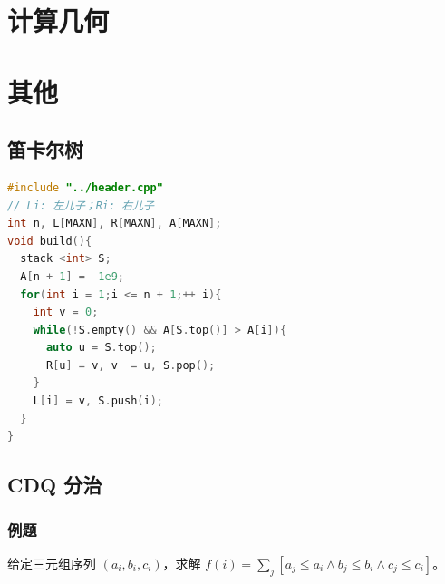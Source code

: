 \documentclass[10pt]{ctexart}
\begin{document}
\begin{multicols}{3}
    \section{计算几何}\label{ux8ba1ux7b97ux51e0ux4f55}

    \section{其他}\label{ux5176ux4ed6}

    \subsection{笛卡尔树}\label{ux7b1bux5361ux5c14ux6811}

\begin{lstlisting}[language={C++}]
#include "../header.cpp"
// Li: 左儿子；Ri: 右儿子
int n, L[MAXN], R[MAXN], A[MAXN];
void build(){
  stack <int> S;
  A[n + 1] = -1e9;
  for(int i = 1;i <= n + 1;++ i){
    int v = 0;
    while(!S.empty() && A[S.top()] > A[i]){
      auto u = S.top();
      R[u] = v, v  = u, S.pop();
    }
    L[i] = v, S.push(i);
  }
}
\end{lstlisting}

    \subsection{CDQ 分治}\label{cdq-ux5206ux6cbb}

    \subsubsection{例题}\label{ux4f8bux9898-5}

    给定三元组序列 \((a_i, b_i, c_i)\)，求解
    \(f(i) = \sum_{j} [a_j \le a_i \land b_j\le b_i \land c_j\le c_i]\)。


\end{multicols}
\end{document}

